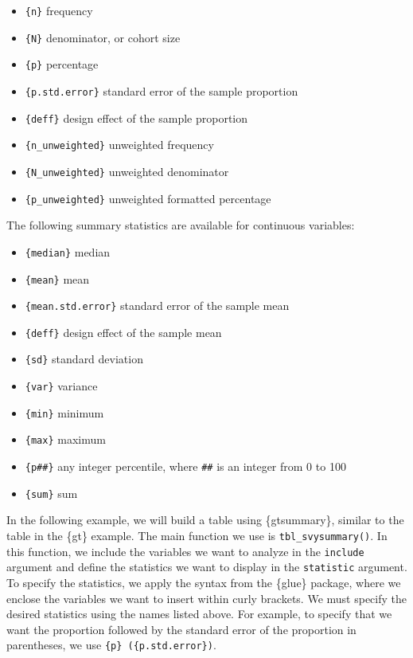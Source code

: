 \documentclass[
]{krantz}
\providecommand{\tightlist}{%
  \setlength{\itemsep}{0pt}\setlength{\parskip}{0pt}}
\begin{document}
\begin{itemize}
\tightlist
\item
  \texttt{\{n\}} frequency
\item
  \texttt{\{N\}} denominator, or cohort size
\item
  \texttt{\{p\}} percentage
\item
  \texttt{\{p.std.error\}} standard error of the sample proportion
\item
  \texttt{\{deff\}} design effect of the sample proportion
\item
  \texttt{\{n\_unweighted\}} unweighted frequency
\item
  \texttt{\{N\_unweighted\}} unweighted denominator
\item
  \texttt{\{p\_unweighted\}} unweighted formatted percentage
\end{itemize}

The following summary statistics are available for continuous variables:

\begin{itemize}
\tightlist
\item
  \texttt{\{median\}} median
\item
  \texttt{\{mean\}} mean
\item
  \texttt{\{mean.std.error\}} standard error of the sample mean
\item
  \texttt{\{deff\}} design effect of the sample mean
\item
  \texttt{\{sd\}} standard deviation
\item
  \texttt{\{var\}} variance
\item
  \texttt{\{min\}} minimum
\item
  \texttt{\{max\}} maximum
\item
  \texttt{\{p\#\#\}} any integer percentile, where \texttt{\#\#} is an integer from 0 to 100
\item
  \texttt{\{sum\}} sum
\end{itemize}

In the following example, we will build a table using \{gtsummary\}, similar to the table in the \{gt\} example. The main function we use is \texttt{tbl\_svysummary()}. In this function, we include the variables we want to analyze in the \texttt{include} argument and define the statistics we want to display in the \texttt{statistic} argument. To specify the statistics, we apply the syntax from the \{glue\} package, where we enclose the variables we want to insert within curly brackets. We must specify the desired statistics using the names listed above. For example, to specify that we want the proportion followed by the standard error of the proportion in parentheses, we use \texttt{\{p\}\ (\{p.std.error\})}.
\end{document}
